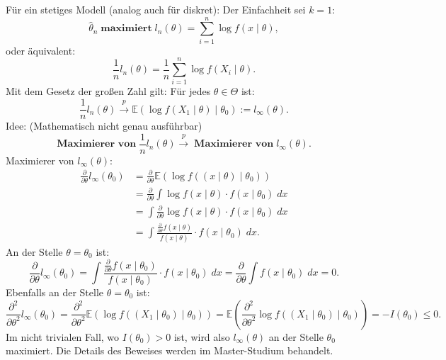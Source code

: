 \documentclass[10pt]{article}
\newcommand{\EW}{\mathbb{E}} %
\newcommand{\KW}{\overset{p} \longrightarrow} %
\newcommand{\xt}{x \mid \theta} %
\newenvironment{BWS}[1][]
{\begin{Beweis}[frametitle=#1]}{\end{Beweis}}
\begin{document}
	\begin{BWS}[Beweisidee 1.3.4 (Konsistenz von ML-Schätzern)]
		Für ein stetiges Modell (analog auch für diskret):
		Der Einfachheit sei $k=1$:
		\begin{equation*}
			\hat{\theta}_n \; \textbf{maximiert} \; l_n(\theta) = \sum_{i=1}^{n}\log f(\xt), 
		\end{equation*}
		oder äquivalent:
		\begin{equation*}
			\frac{1}{n} l_n(\theta) = \frac{1}{n}\sum_{i=1}^{n}\log f(X_i \mid \theta).
		\end{equation*}
		Mit dem Gesetz der großen Zahl gilt:
		Für jedes $\theta \in \Theta$ ist:
		\begin{equation*}
			\frac{1}{n} l_n (\theta) \KW \EW(\log f(X_1 \mid \theta) \mid \theta_0) := l_\infty (\theta).
		\end{equation*}
		Idee: (Mathematisch nicht genau ausführbar)
		\begin{equation*}
			\textbf{Maximierer von} \; \frac{1}{n} l_n(\theta) \KW \; \textbf{Maximierer von} \; l_\infty (\theta).
		\end{equation*}
		Maximierer von $l_\infty (\theta)$:
		\begin{equation*}
			\begin{split}
				\frac{\partial}{\partial \theta} l_\infty (\theta_0) &= \frac{\partial}{\partial \theta} \EW(\log f((x\mid \theta)\mid \theta_0))\\
				&= \frac{\partial}{\partial \theta} \int \log f(x \mid \theta) \cdot f(x \mid \theta_0) \; dx \\
				&= \int \frac{\partial}{\partial \theta} \log f(x \mid \theta) \cdot f(x\mid \theta_0) \; dx \\
				&=\int \frac{\frac{\partial}{\partial \theta} f(x\mid \theta)}{f(x\mid \theta)} \cdot f(x\mid \theta_0) \; dx. 
			\end{split}
		\end{equation*}
		An der Stelle $\theta = \theta_0$ ist:
		\begin{equation*}
			\frac{\partial}{\partial \theta} l_\infty (\theta_0) = \int \frac{\frac{\partial}{\partial \theta} f(x\mid\theta_0)}{f(x\mid\theta_0)} \cdot f(x\mid\theta_0) \; dx = \frac{\partial}{\partial \theta} \int f(x\mid\theta_0) \; dx = 0.
		\end{equation*}
		Ebenfalls an der Stelle $\theta = \theta_0$ ist:
		\begin{equation*}
			\frac{\partial^2}{\partial \theta^2} l_\infty(\theta_0) = \frac{\partial^2}{\partial \theta^2} \EW (\log f((X_1 \mid \theta_0) \mid \theta_0)) = \EW \left(\frac{\partial^2}{\partial \theta^2}\log f\left(\left(X_1 \mid \theta_0\right) \mid \theta_0\right)\right) = - I(\theta_0) \leq 0.
		\end{equation*}
		Im nicht trivialen Fall, wo $I(\theta_0) > 0$ ist, wird also $l_\infty (\theta)$ an der Stelle $\theta_0$ maximiert. Die Details des Beweises werden im Master-Studium behandelt. 
	\end{BWS}
	
\end{document}
